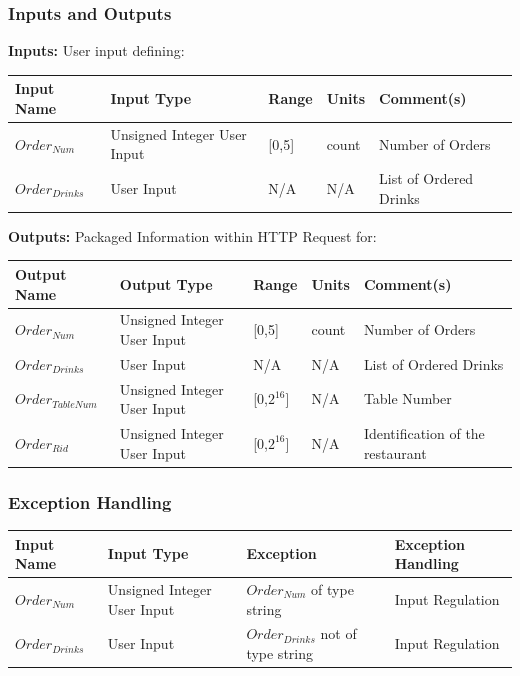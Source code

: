\documentclass [10pt]{article}
\begin{document}
\subsubsection{Inputs and Outputs}

\textbf{Inputs:}  User input defining:\\

\begin{longtable}{|l|l|l|l|l|}\hline 
	\rowcolor{tableCell}\textbf{Input Name} & \textbf{Input Type} & \textbf{Range} & \textbf{Units} & \textbf{Comment(s)} \\ \hline
	$Order_{Num} $ & Unsigned Integer User Input & [0,5] & count &  Number of Orders \\ \hline
	\rowcolor{tableCell}$Order_{Drinks} $ &  User Input & N/A & N/A &  List of Ordered Drinks \\ \hline
\end{longtable}


\textbf{Outputs:} Packaged Information within HTTP Request for: \\

\begin{longtable}{|l|l|l|l|l|}\hline 
	\rowcolor{tableCell}\textbf{Output Name} & \textbf{Output Type} & \textbf{Range} & \textbf{Units} & \textbf{Comment(s)} \\ \hline
	$Order_{Num} $ & Unsigned Integer User Input & [0,5] & count &  Number of Orders \\ \hline
	\rowcolor{tableCell}$Order_{Drinks} $ &  User Input & N/A & N/A &  List of Ordered Drinks \\ \hline
	$Order_{TableNum} $ & Unsigned Integer User Input & [0,$2^{16}$] & N/A &  Table Number \\ \hline
	\rowcolor{tableCell}$Order_{Rid} $ & Unsigned Integer User Input & [0,$2^{16}$] & N/A & Identification of the restaurant \\ \hline
\end{longtable}

\subsubsection{Exception Handling}

\begin{longtable}{|l|l|l|l|}\hline 
	\rowcolor{tableCell}\textbf{Input Name} & \textbf{Input Type} & \textbf{Exception} & \textbf{Exception Handling} \\ \hline
	$Order_{Num} $ & Unsigned Integer User Input & $Order_{Num} $ of type string & Input Regulation  \\ \hline
	\rowcolor{tableCell}$Order_{Drinks} $ &  User Input & $Order_{Drinks} $ not of type string & Input Regulation \\ \hline
\end{longtable}
\end{document}
